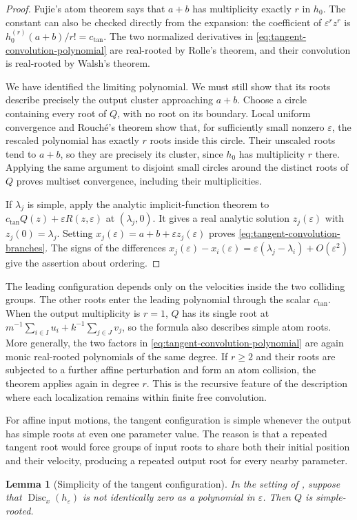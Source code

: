 \documentclass[12pt,reqno]{amsart}
\newtheorem{lemma}[lemma]{Lemma}
\theoremstyle{definition}
\theoremstyle{remark}
\newcommand{\eps}{\varepsilon}
\begin{document}
\begin{proof}
Fujie's atom theorem says that \(a+b\) has multiplicity exactly \(r\)
in \(h_0\).  The constant can also be checked directly from the
expansion: the coefficient of \(\eps^rz^r\) is
\(h_0^{(r)}(a+b)/r!=c_{\mathrm{tan}}\). The two normalized derivatives in
\eqref{eq:tangent-convolution-polynomial} are real-rooted by Rolle's
theorem, and their convolution is real-rooted by Walsh's theorem.

We have identified the limiting polynomial. We must still show that its roots describe precisely the output cluster approaching \(a+b\).  Choose a circle containing every root of \(Q\), with no root on its boundary. Local uniform convergence and Rouch\'e's theorem show that,
for sufficiently small nonzero \(\eps\), the rescaled polynomial
has exactly \(r\) roots inside this circle.  Their unscaled roots tend
to \(a+b\), so they are precisely its cluster, since \(h_0\) has
multiplicity \(r\) there.  Applying the same argument to disjoint
small circles around the distinct roots of \(Q\) proves multiset
convergence, including their multiplicities.

If \(\lambda_j\) is simple, apply the analytic implicit-function
theorem to \(c_{\mathrm{tan}}Q(z)+\eps R(z,\eps)\) at \((\lambda_j,0)\).
It gives a real analytic solution \(z_j(\eps)\) with
\(z_j(0)=\lambda_j\).  Setting
\(x_j(\eps)=a+b+\eps z_j(\eps)\) proves
\eqref{eq:tangent-convolution-branches}.  The signs of the differences
\(x_j(\eps)-x_i(\eps)=\eps(\lambda_j-\lambda_i)+O(\eps^2)\)
give the assertion about ordering.
\end{proof}

The leading configuration depends only on the velocities inside the two
colliding groups.  The other roots enter the leading polynomial through
the scalar \(c_{\mathrm{tan}}\). When the output multiplicity is \(r=1\), \(Q\) has its single root at
\(m^{-1}\sum_{i\in I}u_i+k^{-1}\sum_{j\in J}v_j\), so the
formula also describes simple atom roots.  More generally, the two
factors in \eqref{eq:tangent-convolution-polynomial} are again monic
real-rooted polynomials of the same degree.  If \(r\geq2\) and their roots are subjected to a further affine perturbation and form an atom collision, the theorem applies again in degree \(r\).  This is the recursive feature of the description where each localization remains within finite free convolution.

For affine input motions, the tangent configuration is simple whenever the output has simple roots at even one parameter value. The reason is that a repeated tangent root would force groups of input roots to share both their initial position and their velocity, producing a repeated output root for every nearby parameter.
\begin{lemma}[Simplicity of the tangent configuration]
\label{lem:affine-tangent-simplicity}
In the setting of , suppose that
\(\operatorname{Disc}_x(h_\eps)\) is not identically zero as a
polynomial in \(\eps\).  Then \(Q\) is simple-rooted.
\end{lemma}
\end{document}
